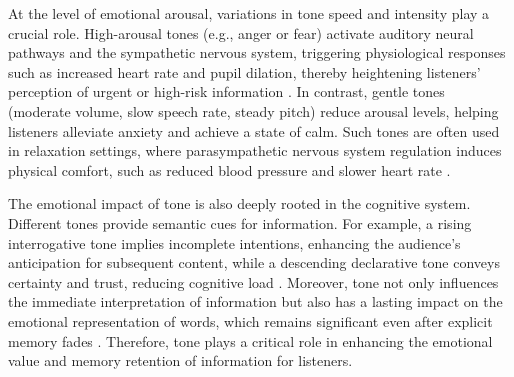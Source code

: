 At the level of emotional arousal, variations in tone speed and intensity play a crucial role. High-arousal tones (e.g., anger or fear) activate auditory neural pathways and the sympathetic nervous system, triggering physiological responses such as increased heart rate and pupil dilation, thereby heightening listeners’ perception of urgent or high-risk information \cite{bestelmeyer2017effects}. In contrast, gentle tones (moderate volume, slow speech rate, steady pitch) reduce arousal levels, helping listeners alleviate anxiety and achieve a state of calm. Such tones are often used in relaxation settings, where parasympathetic nervous system regulation induces physical comfort, such as reduced blood pressure and slower heart rate \cite{gobl2003role}.

The emotional impact of tone is also deeply rooted in the cognitive system. Different tones provide semantic cues for information. For example, a rising interrogative tone implies incomplete intentions, enhancing the audience’s anticipation for subsequent content, while a descending declarative tone conveys certainty and trust, reducing cognitive load \cite{zajonc1980feeling}. Moreover, tone not only influences the immediate interpretation of information but also has a lasting impact on the emotional representation of words, which remains significant even after explicit memory fades \cite{schirmer2010mark}. Therefore, tone plays a critical role in enhancing the emotional value and memory retention of information for listeners.

